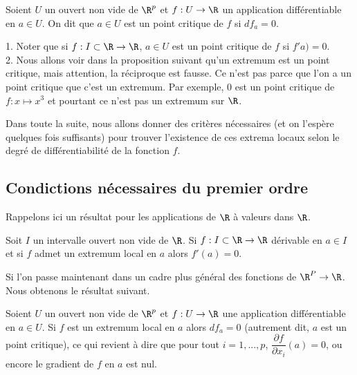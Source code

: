\documentclass[class=report,crop=false]{standalone}
\begin{document}
\begin{definition}
\textcolor[rgb]{0.98,0.00,0.00}{
  Soient $U$ un ouvert non vide de $\R^p$ et $f: U  \rightarrow \R$ un application différentiable en  $a \in U$. On dit que $a \in U$ est un point critique de $f$
  si $df_a=0$.}
\end{definition}

\begin{remarque*} $ $\\
\textcolor[rgb]{0.00,0.00,1.00}{
1. Noter que si $f: I \subset \R \rightarrow \R$, $a \in U$ est un point critique de $f$ si $f'a)=0$. \\
2. Nous allons voir dans la proposition suivant qu'un extremum est un point critique, mais attention, la réciproque est fausse. 
Ce n'est pas parce que l'on a un point critique que c'est un extremum. Par exemple, $0$ est un point critique de $f: x \mapsto x^3$ et pourtant ce n'est pas un extremum sur $\R$.
}
\end{remarque*}

\noindent Dans toute la suite, nous allons donner des critères nécessaires (et on l'espère quelques fois suffisants) pour trouver l'existence de ces extrema locaux selon le degré de différentiabilité de la fonction $f$.
\subsection{Condictions nécessaires du premier ordre}
\noindent Rappelons ici un résultat pour les applications de $\R$  à valeurs dans $\R$.

\begin{proposition}
\textcolor[rgb]{0.44,0.00,0.87}{
 Soit $I$ un intervalle ouvert non vide de $\R$. Si $f: I \subset \R \rightarrow \R$ dérivable en $a \in I$
et si $f$ admet un extremum local en $a$ alors $f'(a)=0$.  }
\end{proposition}

\noindent Si l'on passe maintenant dans un cadre plus général des fonctions de $\R^P \rightarrow \R$. Nous obtenons le résultat suivant.

\begin{proposition}
\textcolor[rgb]{0.44,0.00,0.87}{
 Soient $U$ un ouvert non vide de $\R^p$ et $f: U  \rightarrow \R$ une application différentiable en $a \in U$. Si $f$ est un extremum local en $a$ alors  $df_a=0$ (autrement dit, $a$ est un point critique), ce qui revient à dire que pour tout $i=1,...,p$, $\dfrac{\partial f}{\partial x_i}(a)=0$, ou encore le gradient de $f$ en $a$ est nul.}
\end{proposition}
\end{document}
